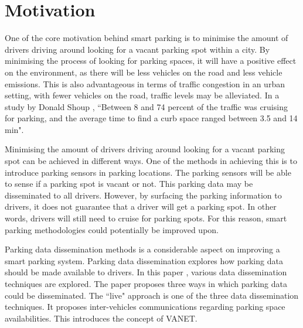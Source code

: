 \section{Motivation}\label{s:motivation}
One of the core motivation behind smart parking is to minimise the amount of drivers driving around looking for a vacant parking spot within a city. By minimising the process of looking for parking spaces, it will have a positive effect on the environment, as there will be less vehicles on the road and less vehicle emissions. This is also advantageous in terms of traffic congestion in an urban setting, with fewer vehicles on the road, traffic levels may be alleviated. In a study by Donald Shoup \citep{Shoup2006CruisingParking}, ``Between 8 and 74 percent of the traffic was cruising for parking, and the average time to find a curb space ranged between 3.5 and 14 min".

Minimising the amount of drivers driving around looking for a vacant parking spot can be achieved in different ways. One of the methods in achieving this is to introduce parking sensors in parking locations. The parking sensors will be able to sense if a parking spot is vacant or not. This parking data may be disseminated to all drivers. However, by surfacing the parking information to drivers, it does not guarantee that a driver will get a parking spot. In other words, drivers will still need to cruise for parking spots. For this reason, smart parking methodologies could potentially be improved upon.

Parking data dissemination methods is a considerable aspect on improving a smart parking system. Parking data dissemination explores how parking data should be made available to drivers. In this paper \citep{Verroios2011ReachingNetworking}, various data dissemination techniques are explored. The paper proposes three ways in which parking data could be disseminated. The ``live" approach is one of the three data dissemination techniques. It proposes inter-vehicles communications regarding parking space availabilities. This introduces the concept of \ac{VANET}.

